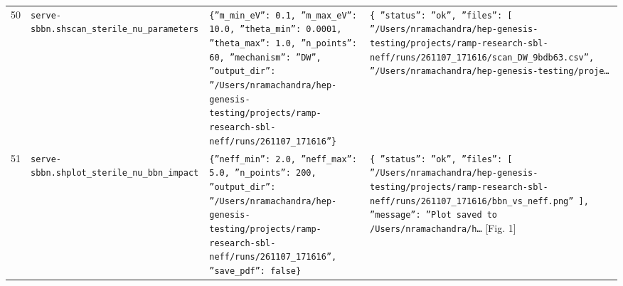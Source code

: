 \documentclass[11pt,a4paper]{article}
\begin{document}
\begin{longtable}{@{}p{}p{}p{}p{}@{}}
50 & \texttt{serve-sbbn.sh}\newline\texttt{scan\_\allowbreak{}sterile\_\allowbreak{}nu\_\allowbreak{}parameters} & \texttt{\{''m\_\allowbreak{}min\_\allowbreak{}eV'':\allowbreak{} 0.1,\allowbreak{} ''m\_\allowbreak{}max\_\allowbreak{}eV'':\allowbreak{} 10.0,\allowbreak{} ''theta\_\allowbreak{}min'':\allowbreak{} 0.0001,\allowbreak{} ''theta\_\allowbreak{}max'':\allowbreak{} 1.0,\allowbreak{} ''n\_\allowbreak{}points'':\allowbreak{} 60,\allowbreak{} ''mechanism'':\allowbreak{} ''DW'',\allowbreak{} ''output\_\allowbreak{}dir'':\allowbreak{} ''/\allowbreak{}Users/\allowbreak{}nramachandra/\allowbreak{}hep-genesis-testing/\allowbreak{}projects/\allowbreak{}ramp-research-sbl-neff/\allowbreak{}runs/\allowbreak{}261107\_\allowbreak{}171616''\}\allowbreak{}} & \texttt{\{   ''status'':\allowbreak{} ''ok'',\allowbreak{}   ''files'':\allowbreak{} [     ''/\allowbreak{}Users/\allowbreak{}nramachandra/\allowbreak{}hep-genesis-testing/\allowbreak{}projects/\allowbreak{}ramp-research-sbl-neff/\allowbreak{}runs/\allowbreak{}261107\_\allowbreak{}171616/\allowbreak{}scan\_\allowbreak{}DW\_\allowbreak{}9bdb63.csv'',\allowbreak{}     ''/\allowbreak{}Users/\allowbreak{}nramachandra/\allowbreak{}hep-genesis-testing/\allowbreak{}proje\ldots{}\allowbreak{}} \\
51 & \texttt{serve-sbbn.sh}\newline\texttt{plot\_\allowbreak{}sterile\_\allowbreak{}nu\_\allowbreak{}bbn\_\allowbreak{}impact} & \texttt{\{''neff\_\allowbreak{}min'':\allowbreak{} 2.0,\allowbreak{} ''neff\_\allowbreak{}max'':\allowbreak{} 5.0,\allowbreak{} ''n\_\allowbreak{}points'':\allowbreak{} 200,\allowbreak{} ''output\_\allowbreak{}dir'':\allowbreak{} ''/\allowbreak{}Users/\allowbreak{}nramachandra/\allowbreak{}hep-genesis-testing/\allowbreak{}projects/\allowbreak{}ramp-research-sbl-neff/\allowbreak{}runs/\allowbreak{}261107\_\allowbreak{}171616'',\allowbreak{} ''save\_\allowbreak{}pdf'':\allowbreak{} false\}\allowbreak{}} & \texttt{\{   ''status'':\allowbreak{} ''ok'',\allowbreak{}   ''files'':\allowbreak{} [     ''/\allowbreak{}Users/\allowbreak{}nramachandra/\allowbreak{}hep-genesis-testing/\allowbreak{}projects/\allowbreak{}ramp-research-sbl-neff/\allowbreak{}runs/\allowbreak{}261107\_\allowbreak{}171616/\allowbreak{}bbn\_\allowbreak{}vs\_\allowbreak{}neff.png''   ]\allowbreak{},\allowbreak{}   ''message'':\allowbreak{} ''Plot saved to /\allowbreak{}Users/\allowbreak{}nramachandra/\allowbreak{}h\ldots{}\allowbreak{}} [Fig. 1] \\

\end{longtable}
\end{document}
